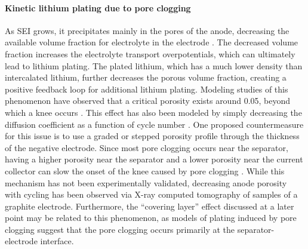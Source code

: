 \documentclass[journal=jpclcd,manuscript=article]{achemso}
\begin{document}
\paragraph{Kinetic lithium plating due to pore clogging}
As SEI grows, it precipitates mainly in the pores of the anode, decreasing the available volume fraction for electrolyte in the electrode \cite{sikha_effect_2004}. The decreased volume fraction increases the electrolyte transport overpotentials, which can ultimately lead to lithium plating. The plated lithium, which has a much lower density than intercalated lithium\cite{yang_modeling_2017}, further decreases the porous volume fraction, creating a positive feedback loop for additional lithium plating\cite{yang_modeling_2017}. Modeling studies of this phenomenon have observed that a critical porosity exists around 0.05, beyond which a knee occurs \cite{yang_modeling_2017, muller_model-based_2019}. This effect has also been modeled by simply decreasing the diffusion coefficient as a function of cycle number \cite{keil_electrochemical_2020}. One proposed countermeasure for this issue is to use a graded or stepped porosity profile through the thickness of the negative electrode. Since most pore clogging occurs near the separator, having a higher porosity near the separator and a lower porosity near the current collector can slow the onset of the knee caused by pore clogging \cite{muller_model-based_2019}.
While this mechanism has not been experimentally validated, decreasing anode porosity with cycling has been observed via X-ray computed tomography of samples of a graphite electrode.\cite{frisco_understanding_2016, rahe_nanoscale_2019} Furthermore, the ``covering layer'' effect discussed at a later point may be related to this phenomenon, as models of plating induced by pore clogging suggest that the pore clogging occurs primarily at the separator-electrode interface.\cite{yang_modeling_2017}
\end{document}
